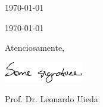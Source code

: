 \documentclass[onecolumn,10pt]{article}
\newcommand{\Author}{Prof. Dr. Leonardo Uieda}
\begin{document}
\begin{flushright}
  \today
\end{flushright}
\begin{flushleft}
  \today
\end{flushleft}

\lipsum[1-2]

\vspace{1cm}
\begin{flushleft}
  Atenciosamente,

  \vspace{1cm}
  \includegraphics[height=0.9cm]{assinatura.png}

  \Author{}
\end{flushleft}
\end{document}
